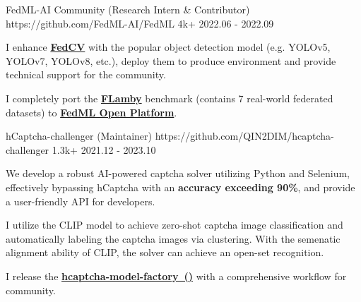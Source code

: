 
\begin{cventries}

\cvproject
{FedML-AI Community (Research Intern \& Contributor)} %
{https://github.com/FedML-AI/FedML} %
{4k+} %
{2022.06 - 2022.09} %
{
\begin{cvitems} %
\item {I enhance \href{https://github.com/FedML-AI/FedCV}{\textbf{FedCV}} with the popular object detection model (e.g. YOLOv5, YOLOv7, YOLOv8, etc.), deploy them to produce environment and provide technical support for the community.}
\item {I completely port the \href{https://github.com/owkin/FLamby}{\textbf{FLamby}} benchmark (contains 7 real-world federated datasets) to \href{https://open.fedml.ai/}{\textbf{FedML Open Platform}}.}
\end{cvitems}
} %



\cvproject
{hCaptcha-challenger (Maintainer)} %
{https://github.com/QIN2DIM/hcaptcha-challenger} %
{1.3k+} %
{2021.12 - 2023.10} %
{
\begin{cvitems} %
\item {We develop a robust AI-powered captcha solver utilizing Python and Selenium, effectively bypassing hCaptcha with an \textbf{accuracy exceeding 90\%}, and provide a user-friendly API for developers.}
\item {I utilize the CLIP model to achieve zero-shot captcha image classification and automatically labeling the captcha images via clustering. With the semenatic alignment ability of CLIP, the solver can achieve an open-set recognition.}
\item {I release the \href{https://github.com/CaptchaAgent/hcaptcha-model-factory}{\textbf{hcaptcha-model-factory~()}} with a comprehensive workflow for community.}
\end{cvitems}
} %



\end{cventries}
